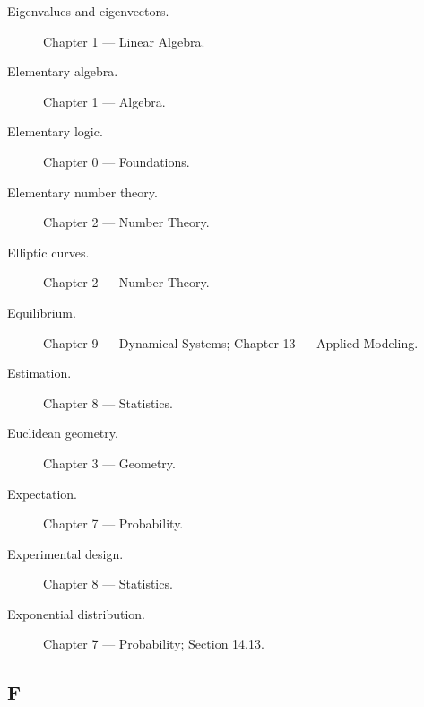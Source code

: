 \begin{description}

\item[Eigenvalues and eigenvectors.]
Chapter 1 --- Linear Algebra.

\item[Elementary algebra.]
Chapter 1 --- Algebra.

\item[Elementary logic.]
Chapter 0 --- Foundations.

\item[Elementary number theory.]
Chapter 2 --- Number Theory.

\item[Elliptic curves.]
Chapter 2 --- Number Theory.

\item[Equilibrium.]
Chapter 9 --- Dynamical Systems;
Chapter 13 --- Applied Modeling.

\item[Estimation.]
Chapter 8 --- Statistics.

\item[Euclidean geometry.]
Chapter 3 --- Geometry.

\item[Expectation.]
Chapter 7 --- Probability.

\item[Experimental design.]
Chapter 8 --- Statistics.

\item[Exponential distribution.]
Chapter 7 --- Probability;
Section 14.13.

\end{description}

\subsection*{F}

